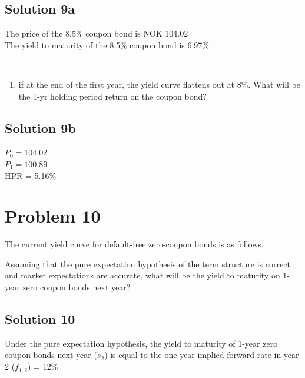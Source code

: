 \documentclass[12]{article}
\begin{document}
\color{blue}
\subsection*{Solution 9a} 
The price of the 8.5\%  coupon bond  is NOK 104.02\\
The yield to maturity of the 8.5\%  coupon bond  is 6.97\%


\noindent
\\
\color{black}
\begin{enumerate}
    \item[b)] if at the end of the first year, the yield curve flattens out at 8\%. What will be the 1-yr holding period return on the coupon bond?
\end{enumerate}

\color{blue}
\subsection*{Solution 9b} 
$P_0 = 104.02$\\
$P_1 = 100.89$\\
HPR = 5.16\%


\color{black}
\section*{Problem 10}
The current yield curve for default-free zero-coupon bonds is as follows.
\begin{table}[H]
\centering
{}
\label{tab:my-table}
\end{table}
Assuming that the pure expectation hypothesis of the term structure is correct and market expectations are accurate, what will be the yield to maturity on 1-year zero coupon bonds next year?

\color{blue}
\subsection*{Solution 10} 
Under the pure expectation hypothesis, the yield to maturity of 1-year zero coupon bonds next year ($s_2$) is equal to the one-year implied forward rate in year 2 ($f_{1,2}$) = 
12\%
\end{document}
